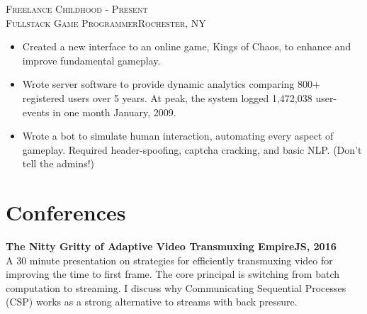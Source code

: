 \documentclass[oneside, final]{scrartcl}
\begin{document}
\begin{center}
\textsc{Freelance \hfill  Childhood - Present\\}
\textsc{Fullstack Game Programmer\hfill Rochester, NY\\}
\begin{itemize}
	\setlength{\itemsep}{1pt}
	\setlength{\parskip}{0pt}
	\setlength{\parsep}{0pt}
	\setlength{\leftmargin}{-5mm}
	\item Created a new interface to an online game, Kings of Chaos, to enhance and improve fundamental gameplay.
	\item Wrote server software to provide dynamic analytics comparing 800+ registered users over 5 years. At peak, the system logged 1,472,038 user-events in one month January, 2009.
	\item Wrote a bot to simulate human interaction, automating every aspect of gameplay. Required header-spoofing, captcha cracking, and basic NLP. (Don't tell the admins!)
\end{itemize}

\clearpage


 \begin{comment}

\textsc{Intellisites \hfill Summer 2009, 2010\\}
\textsc{Web Developer\hfill Albany, NY\\}
\begin{itemize}
	\setlength{\itemsep}{1pt}
	\setlength{\parskip}{0pt}
	\setlength{\parsep}{0pt}
	\setlength{\leftmargin}{-5mm}
	\item Performed security audits on legacy websites for OWASP Top-10 vulnerabilities including SQL injection, Cross-site Scripting and configuration problems.
	\item Wrote file management application with granular user access control and permissions. Application allowed productivity increases in client office.
\end{itemize}

 \end{comment}


\section{Conferences}
\begin{flushleft}
\textbf{The Nitty Gritty of Adaptive Video Transmuxing \hfill EmpireJS, 2016\\}
A 30 minute presentation on strategies for efficiently transmuxing video for improving the
time to first frame. The core principal is switching from batch computation to streaming.
I discuss why Communicating Sequential Processes (CSP) works as a strong alternative to streams with back pressure.
\end{flushleft}


\end{center}
\end{document}
